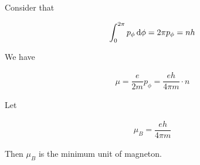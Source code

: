 Consider that

\begin{equation*}
  \begin{aligned}
    \int_0^{2\pi} p_{\phi} \mathop{}\!\mathrm{d} \phi = 2\pi p_{\phi} = nh
  \end{aligned}
\end{equation*}

We have

\begin{equation*}
  \begin{aligned}
    \mu = \dfrac{e}{2 m} p_{\phi} = \dfrac{eh}{4 \pi m} \cdot n
  \end{aligned}
\end{equation*}

Let

\begin{equation*}
  \begin{aligned}
    \mu_B = \dfrac{eh}{4 \pi m} 
  \end{aligned}
\end{equation*}

Then $\mu_B$ is the minimum unit of magneton.











